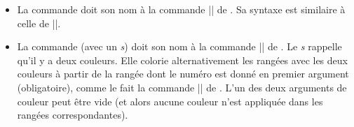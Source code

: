 \documentclass[dvipsnames]{article}%
\begin{document}
\begin{itemize}
\begin{scope}
\hfuzz=10cm
\begin{Code}[width=9cm]
$\begin{NiceArray}{lll}[hvlines]
\CodeBefore
  \emph{\rowcolor{red!15}{1,3-5,8-}}
\Body
a_1 & b_1 & c_1 \\
a_2 & b_2 & c_2 \\
a_3 & b_3 & c_3 \\
a_4 & b_4 & c_4 \\
a_5 & b_5 & c_5 \\
a_6 & b_6 & c_6 \\
a_7 & b_7 & c_7 \\
a_8 & b_8 & c_8 \\
a_9 & b_9 & c_9 \\
a_{10} & b_{10} & c_{10} \\
\end{NiceArray}$
\end{Code}
%
$\begin{NiceArray}{lll}[baseline=4,hvlines]
\CodeBefore
  \rowcolor{red!15}{1,3-5,8-}
\Body
a_1 & b_1 & c_1 \\
a_2 & b_2 & c_2 \\
a_3 & b_3 & c_3 \\
a_4 & b_4 & c_4 \\
a_5 & b_5 & c_5 \\
a_6 & b_6 & c_6 \\
a_7 & b_7 & c_7 \\
a_8 & b_8 & c_8 \\
a_9 & b_9 & c_9 \\
a_{10} & b_{10} & c_{10} \\
\end{NiceArray}$
\end{scope}



\medskip
\item La commande  doit son nom à la
commande |\columncolor| de . Sa syntaxe est similaire à celle de
|\rowcolor|.

\medskip
\item La commande  (avec un \emph{s}) doit
son nom à la commande |\rowcolors| de . Le \emph{s} rappelle qu'il
y a deux couleurs. Elle colorie alternativement les rangées avec les deux
couleurs à partir de la rangée dont le numéro est donné en premier argument
(obligatoire), comme le fait la commande |\rowcolors| de . L'un des
deux arguments de couleur peut être vide (et alors aucune couleur n'est
appliquée dans les rangées correspondantes).


\end{itemize}
\end{document}
